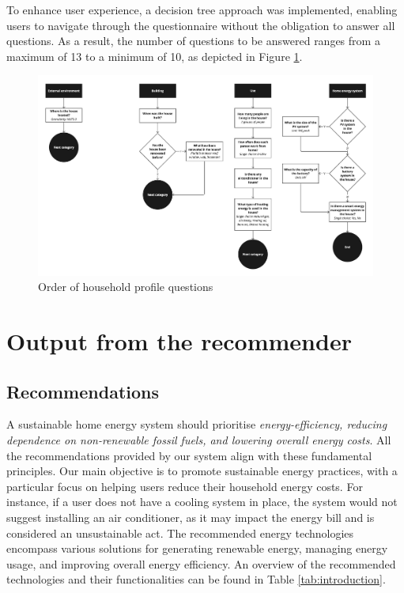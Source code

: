 To enhance user experience, a decision tree approach was implemented, enabling users to navigate through the questionnaire without the obligation to answer all questions.
As a result, the number of questions to be answered ranges from a maximum of 13 to a minimum of 10, as depicted in Figure \ref{fig:trees}. 
\begin{figure}[h!]
  \centering
  \includegraphics[width=\textwidth]{Images/trees.jpg}
  \caption{Order of household profile questions}
  \label{fig:trees}
\end{figure}


\section{Output from the recommender}

\subsection{Recommendations}

A sustainable home energy system should prioritise \emph{energy-efficiency, reducing dependence on non-renewable fossil fuels, and lowering overall energy costs}. 
All the recommendations provided by our system align with these fundamental principles. 
Our main objective is to promote sustainable energy practices, with a particular focus on helping users reduce their household energy costs.
For instance, if a user does not have a cooling system in place, the system would not suggest installing an air conditioner, as it may impact the energy bill and is considered an unsustainable act.
The recommended energy technologies encompass various solutions for generating renewable energy, managing energy usage, and improving overall energy efficiency. 
An overview of the recommended technologies and their functionalities can be found in Table \ref{tab:introduction}.


